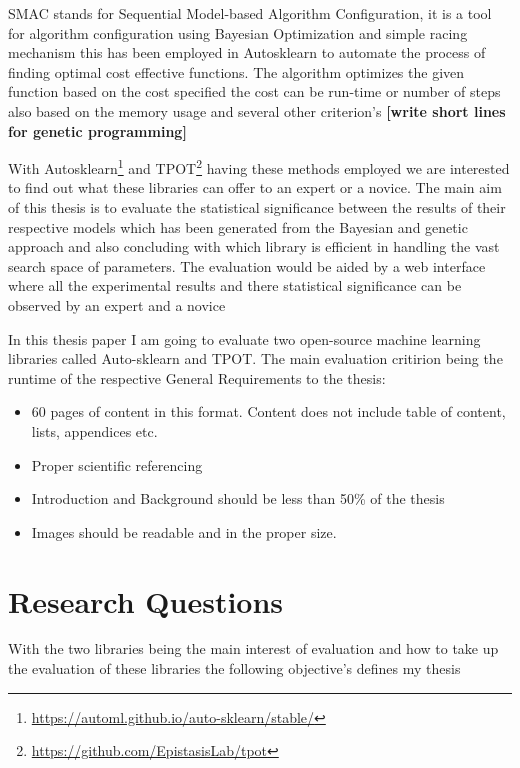 SMAC\cite{smac-2017} stands for Sequential Model-based Algorithm Configuration, it is a tool for algorithm configuration using Bayesian Optimization and simple racing mechanism this has been employed in Autosklearn\cite{autosklearn} to automate the process of finding optimal cost effective functions. The algorithm optimizes the given function based on the cost specified the cost can be run-time or number of steps also based on the memory usage and several other criterion's \textbf{[write short lines for genetic programming]}


With Autosklearn\footnote{\url{https://automl.github.io/auto-sklearn/stable/}} and TPOT\footnote{\url{https://github.com/EpistasisLab/tpot}} having these methods employed we are interested to find out what these libraries can offer to an expert or a novice. The main aim of this thesis is to evaluate the statistical significance between the results of their respective models which has been generated from the Bayesian and genetic approach and also concluding with which library is efficient in handling the vast search space of parameters. The evaluation would be aided by a web interface where all the experimental results and there statistical significance can be observed by an expert and a novice



In this thesis paper I am going to evaluate two open-source machine learning libraries called Auto-sklearn\cite{autosklearn} and TPOT\cite{tpot}. The main evaluation critirion being the runtime of the respective
General Requirements to the thesis:

\begin{itemize}
	\item 60 pages of content in this format. Content does not include table of content, lists, appendices etc.
	\item Proper scientific referencing
	\item Introduction and Background should be less than 50\% of the thesis
	\item Images should be readable and in the proper size. 
\end{itemize}


\section{Research Questions}
With the two libraries being the main interest of evaluation and how to take up the evaluation of these libraries the following objective's defines my thesis


